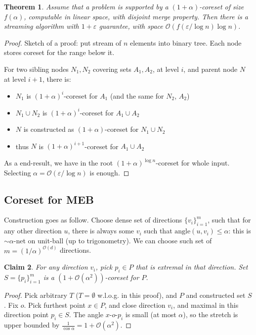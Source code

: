 \documentclass[11pt]{article}
\newtheorem{theorem}{Theorem}
\newtheorem{claim}[theorem]{Claim}
\newcommand{\bigo}{\mathcal{O}}
\begin{document}
\begin{theorem}
Assume that a problem is supported by a $(1+\alpha)$-coreset of size $f(\alpha)$, computable in linear space, with disjoint merge property. Then there is a streaming algorithm with $1+\varepsilon$ guarantee, with space $\bigo(f(\varepsilon/\log n) \log n)$.
\end{theorem}
\begin{proof}
Sketch of a proof: put stream of $n$ elements into binary tree. Each node stores coreset for the range below it. 

For two sibling nodes $N_1, N_2$ covering sets $A_1, A_2$, at level $i$, and parent node $N$ at level $i+1$, there is:
\begin{itemize}
\item $N_1$ is $(1+\alpha)^i$-coreset for $A_1$ (and the same for $N_2$, $A_2$)
\item $N_1 \cup N_2$ is $(1+\alpha)^i$-coreset for $A_1 \cup A_2$
\item $N$ is constructed as $(1+\alpha)$-coreset for $N_1 \cup N_2$
\item thus $N$ is $(1+\alpha)^{i+1}$-coreset for $A_1 \cup A_2$
\end{itemize}

As a end-result, we have in the root $(1+\alpha)^{\log n}$-coreset for whole input. Selecting $\alpha = \bigo(\varepsilon/\log n)$ is enough.
\end{proof}

\subsection{Coreset for MEB}
Construction goes as follow. Choose dense set of directions $\{v_i\}_{i=1}^m$, such that for any other direction $u$, there is always some $v_i$ such that $\text{angle}(u,v_i) \le \alpha$: this is $\sim \alpha$-net on unit-ball (up to trigonometry). We can choose such set of $m = (1/\alpha)^{\bigo(d)}$ directions.

\begin{claim}
For any direction $v_i$, pick $p_i \in P$ that is extremal in that direction. 
Set $S = \{p_i\}_{i=1}^m$  is a $(1+\bigo(\alpha^2))$-coreset for $P$.
\end{claim}
\begin{proof}
Pick arbitrary $T$ ($T= \emptyset$ w.l.o.g. in this proof), and $P$ and constructed set $S$. Fix $o$. Pick furthest point $x \in P$, and close direction $v_i$, and maximal in this direction point $p_i \in S$. The angle $x$-$o$-$p_i$ is small (at most $\alpha$), so the stretch is upper bounded by $\frac{1}{\cos \alpha} = 1 + \bigo(\alpha^2)$.
\end{proof}
\end{document}
